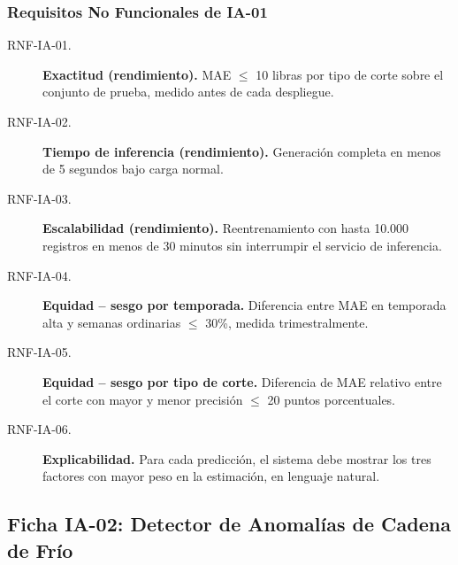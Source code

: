 \documentclass[11pt,a4paper]{article}
\begin{document}
\subsubsection{Requisitos No Funcionales de IA-01}

\begin{description}
  \item[RNF-IA-01.] \textbf{Exactitud (rendimiento).} MAE $\leq$ 10 libras por tipo de corte sobre el conjunto de prueba, medido antes de cada despliegue.
  \item[RNF-IA-02.] \textbf{Tiempo de inferencia (rendimiento).} Generación completa en menos de 5 segundos bajo carga normal.
  \item[RNF-IA-03.] \textbf{Escalabilidad (rendimiento).} Reentrenamiento con hasta 10.000 registros en menos de 30 minutos sin interrumpir el servicio de inferencia.
  \item[RNF-IA-04.] \textbf{Equidad -- sesgo por temporada.} Diferencia entre MAE en temporada alta y semanas ordinarias $\leq$ 30\%, medida trimestralmente.
  \item[RNF-IA-05.] \textbf{Equidad -- sesgo por tipo de corte.} Diferencia de MAE relativo entre el corte con mayor y menor precisión $\leq$ 20 puntos porcentuales.
  \item[RNF-IA-06.] \textbf{Explicabilidad.} Para cada predicción, el sistema debe mostrar los tres factores con mayor peso en la estimación, en lenguaje natural.
\end{description}

\subsection{Ficha IA-02: Detector de Anomalías de Cadena de Frío}
\end{document}
